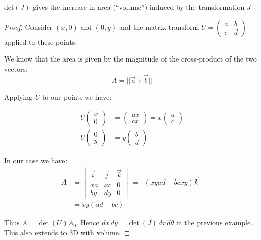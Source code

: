 \documentclass[10pt]{scrartcl}
\begin{document}
\begin{theorem}
det$(J)$ gives the increase in area (``volume'') induced by the transformation  $J$\end{theorem}

\begin{proof}

 Consider $(x,0)$ and $(0,y)$ and the matrix transform $U = \begin{pmatrix}
 a & b \\ c & d	
 \end{pmatrix}$ applied to these points. 

We know that the area is given by the magnitude of the cross-product of the two vectors: 
 \[A = || \vec{a} \times \vec{b}||\]
 
Applying $U$ to our points we have: 

\[
\begin{aligned}
  U\begin{pmatrix}
  x\\0
  \end{pmatrix}
  &= \begin{pmatrix}
 ax\\ cx	
 \end{pmatrix}
 = x\begin{pmatrix}
a \\ c	
\end{pmatrix}\\
  U\begin{pmatrix}
  0\\y
  \end{pmatrix}
 &= y\begin{pmatrix}
b \\ d
\end{pmatrix}
\end{aligned}
\]

In our case we have: 
\[
\begin{aligned}
  A &= \begin{vmatrix}
 \vec{i} & \vec{j} & \vec{k}\\
 xa & xc & 0\\
 by & dy & 0	
 \end{vmatrix}
= || (xyad - bcxy)\vec{k}||\\
&= xy(ad -bc)
\end{aligned}
\]	

Thus $A = \det(U)A_0$. Hence $dx\,dy = \det(J)\,dr\,d\theta$ in the previous example. This also extends to 3D with volume.
\end{proof}~
\end{document}
